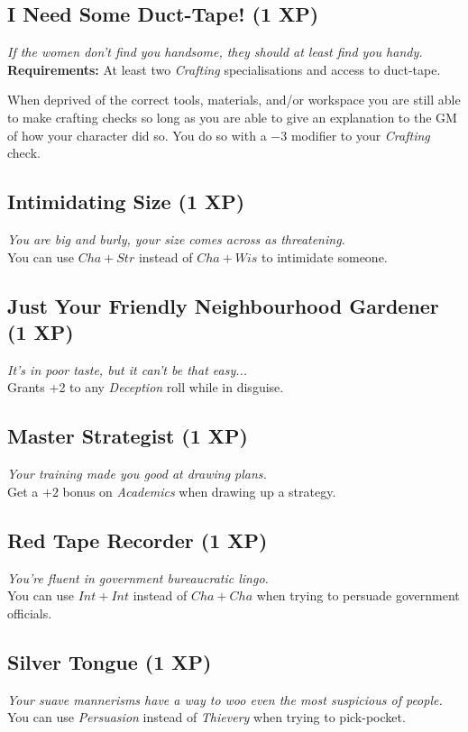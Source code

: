 \subsection{I Need Some Duct-Tape! (1 XP)}
\textit{If the women don't find you handsome, they should at least find you handy.}\\
\textbf{Requirements:} At least two \textit{Crafting} specialisations and access to duct-tape.

When deprived of the correct tools, materials, and/or workspace you are still able to make crafting checks so long as you are able to give an explanation to the GM of how your character did so.
You do so with a $-3$ modifier to your \textit{Crafting} check.

\subsection{Intimidating Size (1 XP)}
\textit{You are big and burly, your size comes across as threatening.}\\
You can use $Cha + Str$ instead of $Cha + Wis$ to intimidate someone.

\subsection{Just Your Friendly Neighbourhood Gardener (1 XP)}
\textit{It's in poor taste, but it can't be that easy...}\\
Grants +2 to any \textit{Deception} roll while in disguise.

\subsection{Master Strategist (1 XP)}
\textit{Your training made you good at drawing plans.}\\
Get a $+2$ bonus on \textit{Academics} when drawing up a strategy.

\subsection{Red Tape Recorder (1 XP)}
\textit{You're fluent in government bureaucratic lingo.}\\ 
You can use $Int + Int$ instead of $Cha + Cha$ when trying to persuade government officials.

\subsection{Silver Tongue (1 XP)}
\textit{Your suave mannerisms have a way to woo even the most suspicious of people.}\\
You can use \textit{Persuasion} instead of \textit{Thievery} when trying to pick-pocket.

